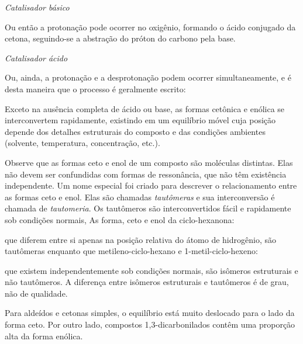 \noindent \textit{Catalisador básico}

\noindent Ou então a protonação pode ocorrer no oxigênio, formando o ácido conjugado da cetona, seguindo-se a abstração do próton do carbono pela base.

\noindent\textit{Catalisador ácido}

\noindent Ou, ainda, a protonação e a desprotonação podem ocorrer simultaneamente, e é desta maneira que o processo é geralmente escrito:

\noindent Exceto na ausência completa de ácido ou base, as formas cetônica e enólica se interconvertem rapidamente, existindo em um equilíbrio móvel cuja posição depende dos detalhes estruturais do composto e das condições ambientes (solvente, temperatura, concentração, etc.).

Observe que as formas ceto e enol de um composto são moléculas distintas. Elas não devem ser confundidas com formas de ressonância, que não têm existência independente. Um nome especial foi criado para descrever o relacionamento entre as formas ceto e enol. Elas são chamadas \textit{tautômeras} e sua interconversão é chamada de \textit{tautomeria}. Os tautômeros são interconvertidos fácil e rapidamente sob condições normais, As forma, ceto e enol da ciclo-hexanona:



\noindent que diferem entre si apenas na posição relativa do átomo de hidrogênio, são tautômeras enquanto que metileno-ciclo-hexano e 1-metil-ciclo-hexeno:



\noindent que existem independentemente sob condições normais, são isômeros estruturais e não tautômeros. A diferença entre isômeros estruturais e tautômeros é de grau, não de qualidade.


Para aldeídos e cetonas simples, o equilíbrio está muito deslocado para o lado da forma ceto. Por outro lado, compostos 1,3-dicarbonilados contêm uma proporção alta da forma enólica.

\begin{tightcenter}
    \chemnameinit{}
    \qquad
    \qquad
\end{tightcenter}


